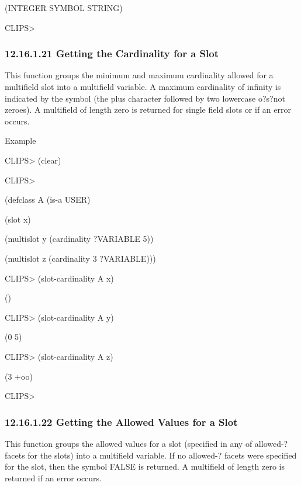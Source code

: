 \documentclass[letterpaper,10pt,english]{sphinxmanual}
\begin{document}
(INTEGER SYMBOL STRING)

CLIPS\textgreater{}


\subsubsection{12.16.1.21 Getting the Cardinality for a Slot}
\label{\detokenize{actions:getting-the-cardinality-for-a-slot}}
This function groups the minimum and maximum cardinality allowed for a
multifield slot into a multifield variable. A maximum cardinality of
infinity is indicated by the symbol  (the plus character followed
by two lowercase o?s?not zeroes). A multifield of length zero is
returned for single field slots or if an error occurs.


\begin{sphinxVerbatim}[commandchars=\\\{\}]
  
\end{sphinxVerbatim}

Example

CLIPS\textgreater{} (clear)

CLIPS\textgreater{}

(defclass A (is-a USER)

(slot x)

(multislot y (cardinality ?VARIABLE 5))

(multislot z (cardinality 3 ?VARIABLE)))

CLIPS\textgreater{} (slot-cardinality A x)

()

CLIPS\textgreater{} (slot-cardinality A y)

(0 5)

CLIPS\textgreater{} (slot-cardinality A z)

(3 +oo)

CLIPS\textgreater{}


\subsubsection{12.16.1.22 Getting the Allowed Values for a Slot}
\label{\detokenize{actions:getting-the-allowed-values-for-a-slot}}
This function groups the allowed values for a slot (specified in any of
allowed-? facets for the slots) into a multifield variable. If no
allowed-? facets were specified for the slot, then the symbol FALSE is
returned. A multifield of length zero is returned if an error occurs.
\end{document}
